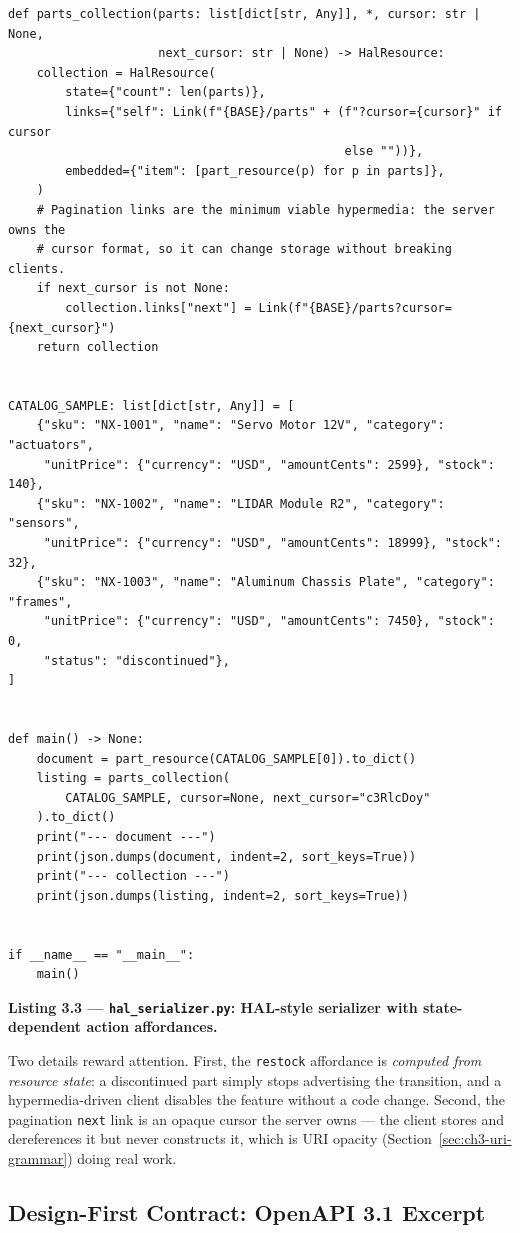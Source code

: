 \begin{verbatim}
def parts_collection(parts: list[dict[str, Any]], *, cursor: str | None,
                     next_cursor: str | None) -> HalResource:
    collection = HalResource(
        state={"count": len(parts)},
        links={"self": Link(f"{BASE}/parts" + (f"?cursor={cursor}" if cursor
                                               else ""))},
        embedded={"item": [part_resource(p) for p in parts]},
    )
    # Pagination links are the minimum viable hypermedia: the server owns the
    # cursor format, so it can change storage without breaking clients.
    if next_cursor is not None:
        collection.links["next"] = Link(f"{BASE}/parts?cursor={next_cursor}")
    return collection


CATALOG_SAMPLE: list[dict[str, Any]] = [
    {"sku": "NX-1001", "name": "Servo Motor 12V", "category": "actuators",
     "unitPrice": {"currency": "USD", "amountCents": 2599}, "stock": 140},
    {"sku": "NX-1002", "name": "LIDAR Module R2", "category": "sensors",
     "unitPrice": {"currency": "USD", "amountCents": 18999}, "stock": 32},
    {"sku": "NX-1003", "name": "Aluminum Chassis Plate", "category": "frames",
     "unitPrice": {"currency": "USD", "amountCents": 7450}, "stock": 0,
     "status": "discontinued"},
]


def main() -> None:
    document = part_resource(CATALOG_SAMPLE[0]).to_dict()
    listing = parts_collection(
        CATALOG_SAMPLE, cursor=None, next_cursor="c3RlcDoy"
    ).to_dict()
    print("--- document ---")
    print(json.dumps(document, indent=2, sort_keys=True))
    print("--- collection ---")
    print(json.dumps(listing, indent=2, sort_keys=True))


if __name__ == "__main__":
    main()
\end{verbatim}

\noindent\textbf{Listing 3.3 --- \texttt{hal\_serializer.py}: HAL-style
serializer with state-dependent action affordances.}\label{lst:ch3-hal}

Two details reward attention. First, the \texttt{restock} affordance is
\emph{computed from resource state}: a discontinued part simply stops
advertising the transition, and a hypermedia-driven client disables the feature
without a code change. Second, the pagination \texttt{next} link is an opaque
cursor the server owns --- the client stores and dereferences it but never
constructs it, which is URI opacity (Section~\ref{sec:ch3-uri-grammar}) doing
real work.

\subsection{Design-First Contract: OpenAPI 3.1 Excerpt}

